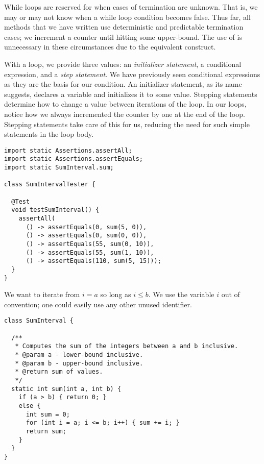 While loops are reserved for when cases of termination are unknown. That is, we may or may not know when a while loop condition becomes false. Thus far, all methods that we have written use deterministic and predictable termination cases; we increment a counter until hitting some upper-bound. The use of  is unnecessary in these circumstances due to the equivalent  construct.

With a  loop, we provide three values: an \emph{initializer statement}, a conditional expression, and a \emph{step statement}. We have previously seen conditional expressions as they are the basis for our  condition. An initializer statement, as its name suggests, declares a variable and initializes it to some value. Stepping statements determine how to change a value between iterations of the loop. In our  loops, notice how we always incremented the counter by one at the end of the loop. Stepping statements take care of this for us, reducing the need for such simple statements in the loop body.


\begin{lstlisting}[language=MyJava]
import static Assertions.assertAll;
import static Assertions.assertEquals;
import static SumInterval.sum;

class SumIntervalTester {

  @Test
  void testSumInterval() {
    assertAll(
      () -> assertEquals(0, sum(5, 0)),
      () -> assertEquals(0, sum(0, 0)),
      () -> assertEquals(55, sum(0, 10)),
      () -> assertEquals(55, sum(1, 10)),
      () -> assertEquals(110, sum(5, 15)));
  }
}
\end{lstlisting}

We want to iterate from $i = a$ so long as $i \leq b$. We use the variable $i$ out of convention; one could easily use any other unused identifier.

\begin{lstlisting}[language=MyJava]
class SumInterval {

  /**
   * Computes the sum of the integers between a and b inclusive.
   * @param a - lower-bound inclusive.
   * @param b - upper-bound inclusive.
   * @return sum of values.
   */
  static int sum(int a, int b) {
    if (a > b) { return 0; } 
    else {
      int sum = 0;
      for (int i = a; i <= b; i++) { sum += i; }
      return sum;
    }
  }
}
\end{lstlisting}


